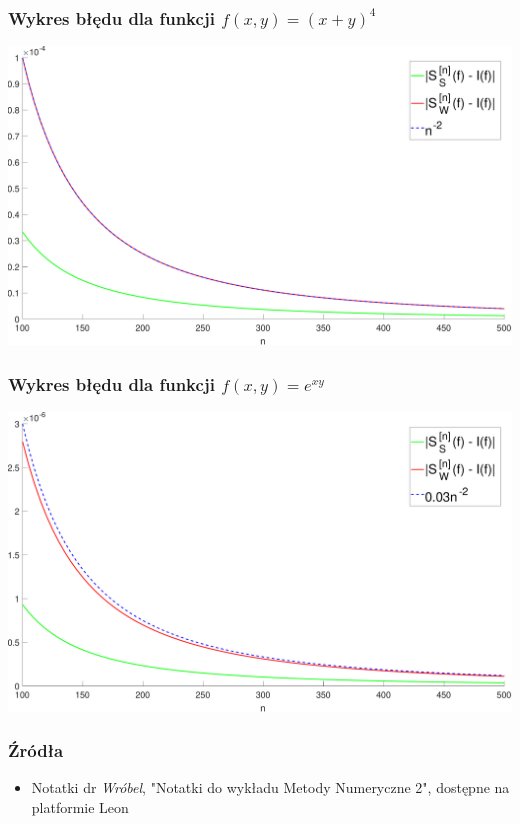\documentclass[9pt]{beamer}
\begin{document}
\begin{frame}
	\frametitle{Wykres błędu dla funkcji $f(x,y) = (x+y)^4$}
	\includegraphics[width = \linewidth]{(x+y)4-100-500-5.pdf}
\end{frame}

\begin{frame}
	\frametitle{Wykres błędu dla funkcji $f(x,y) = e^{xy}$}
	\includegraphics[width = \linewidth]{exp(xy)-100-500-5.pdf}
\end{frame}

\begin{frame}
	\frametitle{Źródła}
	\begin{itemize}
		\item Notatki dr \textit{Wróbel}, "Notatki do wykładu Metody Numeryczne 2", dostępne na platformie Leon
	\end{itemize}
\end{frame}
\end{document}

